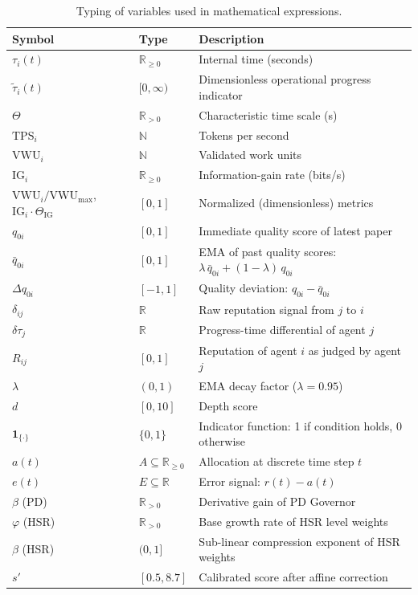 \documentclass[11pt,a4paper]{article}
\theoremstyle{plain}
\theoremstyle{definition}
\theoremstyle{remark}
\newcommand{\tauhat}{\tilde{\tau}}
\newcommand{\indicator}[1]{\mathbf{1}_{\{#1\}}}
\newcommand{\qbar}{\bar{q}_{0i}}
\begin{document}
\begin{table}[ht]
\centering
\caption{Typing of variables used in mathematical expressions.}
\label{tab:notation}
\begin{tabular}{@{}lp{2.5cm}p{8cm}@{}}
\toprule
\textbf{Symbol} & \textbf{Type} & \textbf{Description} \\
\midrule
$\tau_i(t)$         & $\mathbb{R}_{\geq 0}$ & Internal time (seconds) \\
$\tauhat_i(t)$      & $[0, \infty)$         & Dimensionless operational progress indicator \\
$\Theta$            & $\mathbb{R}_{>0}$     & Characteristic time scale (s) \\
$\mathrm{TPS}_i$    & $\mathbb{N}$          & Tokens per second \\
$\mathrm{VWU}_i$    & $\mathbb{N}$          & Validated work units \\
$\mathrm{IG}_i$     & $\mathbb{R}_{\geq 0}$ & Information-gain rate (bits/s) \\
$\mathrm{VWU}_i / \mathrm{VWU}_{\max}$, $\mathrm{IG}_i \cdot \Theta_{\mathrm{IG}}$ & $[0,1]$ & Normalized (dimensionless) metrics \\
$q_{0i}$            & $[0,1]$               & Immediate quality score of latest paper \\
$\qbar$             & $[0,1]$               & EMA of past quality scores: $\lambda\,\qbar + (1-\lambda)\,q_{0i}$ \\
$\Delta q_{0i}$     & $[-1,1]$              & Quality deviation: $q_{0i} - \qbar$ \\
$\delta_{ij}$       & $\mathbb{R}$          & Raw reputation signal from $j$ to $i$ \\
$\delta\tau_j$      & $\mathbb{R}$          & Progress-time differential of agent $j$ \\
$R_{ij}$            & $[0,1]$               & Reputation of agent $i$ as judged by agent $j$ \\
$\lambda$           & $(0,1)$               & EMA decay factor ($\lambda = 0.95$) \\
$d$                 & $[0,10]$              & Depth score \\
$\indicator{\cdot}$ & $\{0,1\}$             & Indicator function: 1 if condition holds, 0 otherwise \\
$a(t)$              & $A \subseteq \mathbb{R}_{\geq 0}$ & Allocation at discrete time step $t$ \\
$e(t)$              & $E \subseteq \mathbb{R}$          & Error signal: $r(t) - a(t)$ \\
$\beta$ (PD)        & $\mathbb{R}_{>0}$     & Derivative gain of PD Governor \\
$\varphi$ (HSR)     & $\mathbb{R}_{>0}$     & Base growth rate of HSR level weights \\
$\beta$ (HSR)       & $(0,1]$               & Sub-linear compression exponent of HSR weights \\
$s'$                & $[0.5, 8.7]$          & Calibrated score after affine correction \\
\bottomrule
\end{tabular}
\end{table}
\end{document}
